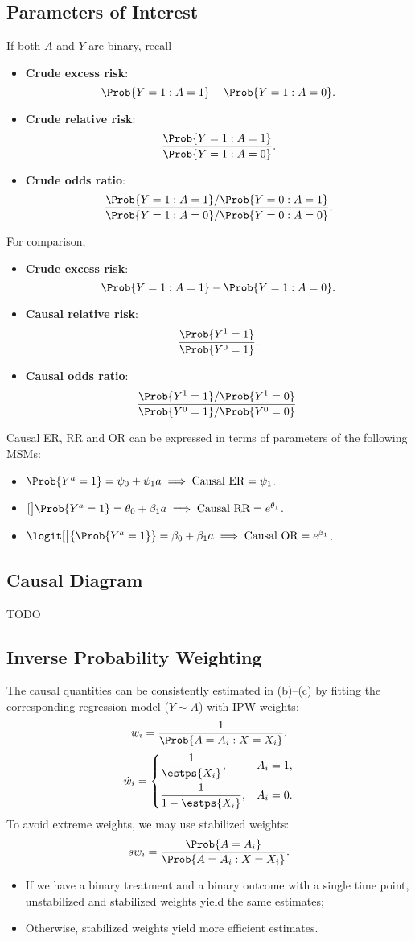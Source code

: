 \documentclass[oneside]{book}\usepackage[]{graphicx}\usepackage[svgnames]{xcolor}
\providecommand\given{} %
\renewcommand\given{\nonscript\:\delimsize\vert\nonscript\:\mathopen{}}%
\renewcommand\given{\nonscript\:\delimsize\vert\nonscript\:\mathopen{}}%
\renewcommand\given{\nonscript\:\delimsize\vert\nonscript\:\mathopen{}}%
\renewcommand\given{\nonscript\:\delimsize\vert\nonscript\:\mathopen{}}%
\renewcommand\given{\nonscript\:\delimsize\vert\nonscript\:\mathopen{}}%
\renewcommand\given{\nonscript\:\delimsize\vert\nonscript\:\mathopen{}}%
\renewcommand\given{\nonscript\:\delimsize\vert\nonscript\:\mathopen{}}%
\renewcommand\given{\nonscript\:\delimsize\vert\nonscript\:\mathopen{}}%
\renewcommand\given{\nonscript\:\delimsize\vert\nonscript\:\mathopen{}}%
\renewcommand\given{\nonscript\:\delimsize\vert\nonscript\:\mathopen{}}%
\renewcommand\given{\nonscript\:\delimsize\vert\nonscript\:\mathopen{}}%
\renewcommand\given{\nonscript\:\delimsize\vert\nonscript\:\mathopen{}}%
\renewcommand\given{\nonscript\:\delimsize\vert\nonscript\:\mathopen{}}%
\renewcommand\given{\nonscript\:\delimsize\vert\nonscript\:\mathopen{}}%
\let\log\relax%
\renewcommand\given{:}
\begin{document}
\subsection*{Parameters of Interest}
If both $A$ and $Y$ are binary, recall
\begin{itemize}
    \item \textbf{Crude excess risk}:
          \[ \Prob{Y=1\given A=1}-\Prob{Y=1\given A=0}. \]
    \item \textbf{Crude relative risk}:
          \[ \frac{\Prob{Y=1\given A=1}}{\Prob{Y=1\given A=0}}. \]
    \item \textbf{Crude odds ratio}:
          \[ \frac{\Prob{Y=1\given A=1}/\Prob{Y=0\given A=1}}{\Prob{Y=1\given A=0}/\Prob{Y=0\given A=0}}. \]
\end{itemize}
For comparison,
\begin{itemize}
    \item \textbf{Crude excess risk}:
          \[ \Prob{Y=1\given A=1}-\Prob{Y=1\given A=0}. \]
    \item \textbf{Causal relative risk}:
          \[ \frac{\Prob{Y^1=1}}{\Prob{Y^0=1}}. \]
    \item \textbf{Causal odds ratio}:
          \[ \frac{\Prob{Y^1=1}/\Prob{Y^1=0}}{\Prob{Y^0=1}/\Prob{Y^0=0}}. \]
\end{itemize}
Causal ER, RR and OR can be expressed in terms of parameters of
the following MSMs:
\begin{itemize}
    \item $ \Prob{Y^a=1}=\psi_0+\psi_1 a\implies\text{Causal ER}=\psi_1 $.
    \item $ \log[\big]{\Prob{Y^a=1}}=\theta_0+\beta_1a\implies\text{Causal RR}=e^{\theta_1} $.
    \item $ \logit[\big]{\Prob{Y^a=1}}=\beta_0+\beta_1a\implies\text{Causal OR}=e^{\beta_1} $.
\end{itemize}
\subsection*{Causal Diagram}
TODO
\subsection*{Inverse Probability Weighting}
The causal quantities can be consistently estimated in (b)--(c) by
fitting the corresponding regression model ($Y \sim A$) with IPW
weights:
\[ w_i=\frac{1}{\Prob{A=A_i\given X=X_i}}. \]
\[ \hat{w}_i=\begin{dcases}
        \frac{1}{\estps{X_i}},   & A_i=1, \\
        \frac{1}{1-\estps{X_i}}, & A_i=0.
    \end{dcases} \]
To avoid extreme weights, we may use stabilized weights:
\[ sw_i=\frac{\Prob{A=A_i}}{\Prob{A=A_i\given X=X_i}}. \]
\begin{itemize}
    \item If we have a binary treatment and a binary outcome with a
          single time point, unstabilized and stabilized weights yield the
          same estimates;
    \item Otherwise, stabilized weights yield more efficient estimates.
\end{itemize}
\end{document}
